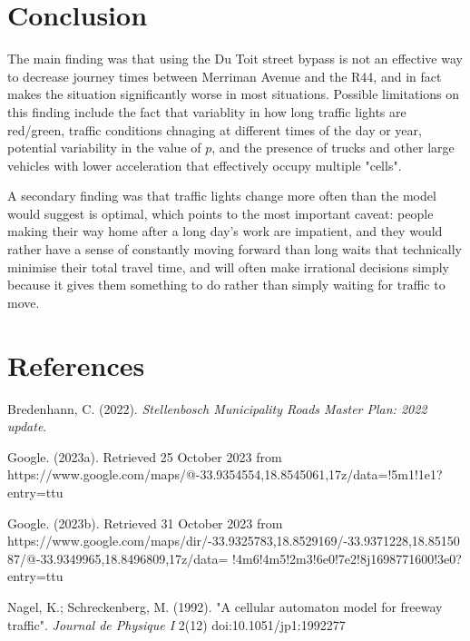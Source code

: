 \documentclass{article}
\begin{document}
\section*{Conclusion}

The main finding was that using the Du Toit street bypass is not an effective way to decrease journey times between Merriman Avenue and the R44, and in fact makes the situation significantly worse in most situations. Possible limitations on this finding include the fact that variablity in how long traffic lights are red/green, traffic conditions chnaging at different times of the day or year, potential variability in the value of $p$, and the presence of trucks and other large vehicles with lower acceleration that effectively occupy multiple "cells".

A secondary finding was that traffic lights change more often than the model would suggest is optimal, which points to the most important caveat: people making their way home after a long day's work are impatient, and they would rather have a sense of constantly moving forward than long waits that technically minimise their total travel time, and will often make irrational decisions simply because it gives them something to do rather than simply waiting for traffic to move.

\section*{References}


Bredenhann, C. (2022). \textit{Stellenbosch Municipality Roads Master Plan: 2022 update}.

Google. (2023a). Retrieved 25 October 2023 from https://www.google.com/maps/@-33.9354554,18.8545061,17z/data=!5m1!1e1?entry=ttu

Google. (2023b). Retrieved 31 October 2023 from https://www.google.com/maps/dir/-33.9325783,18.8529169/-33.9371228,18.8515087/@-33.9349965,18.8496809,17z/data=
!4m6!4m5!2m3!6e0!7e2!8j1698771600!3e0?entry=ttu

Nagel, K.; Schreckenberg, M. (1992). "A cellular automaton model for freeway traffic". \textit{Journal de Physique I} 2(12) doi:10.1051/jp1:1992277
\end{document}
